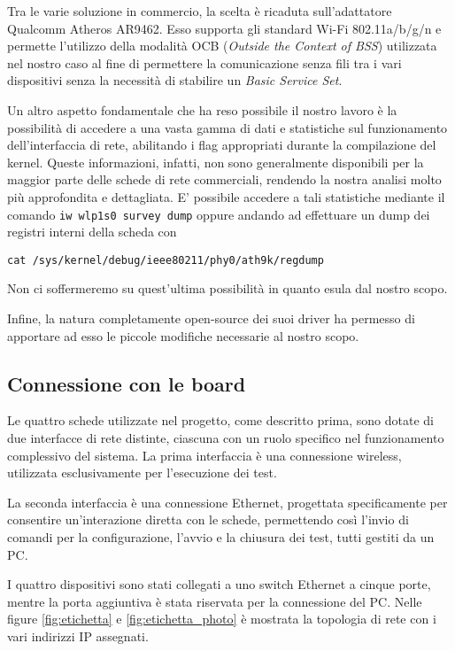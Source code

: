 Tra le varie soluzione in commercio, la scelta è ricaduta sull'adattatore Qualcomm Atheros AR9462. Esso supporta gli standard Wi-Fi 802.11a/b/g/n e permette l'utilizzo della modalità OCB (\textit{Outside the Context of BSS}) utilizzata nel nostro caso al fine di permettere la comunicazione senza fili tra i vari dispositivi senza la necessità di stabilire un \textit{Basic Service Set}.

Un altro aspetto fondamentale che ha reso possibile il nostro lavoro è la possibilità di accedere a una vasta gamma di dati e statistiche sul funzionamento dell'interfaccia di rete, abilitando i flag appropriati durante la compilazione del kernel. Queste informazioni, infatti, non sono generalmente disponibili per la maggior parte delle schede di rete commerciali, rendendo la nostra analisi molto più approfondita e dettagliata. E' possibile accedere a tali statistiche mediante il comando \verb|iw wlp1s0 survey dump| oppure andando ad effettuare un dump dei registri interni della scheda con

\begin{lstlisting}
cat /sys/kernel/debug/ieee80211/phy0/ath9k/regdump
\end{lstlisting}

\noindent Non ci soffermeremo su quest'ultima possibilità in quanto esula dal nostro scopo.

Infine, la natura completamente open-source dei suoi driver ha permesso di apportare ad esso le piccole modifiche necessarie al nostro scopo.

\subsection[Connessione con le board]{Connessione con le board}
Le quattro schede utilizzate nel progetto, come descritto prima, sono dotate di due interfacce di rete distinte, ciascuna con un ruolo specifico nel funzionamento complessivo del sistema. La prima interfaccia è una connessione wireless, utilizzata esclusivamente per l'esecuzione dei test.

La seconda interfaccia è una connessione Ethernet, progettata specificamente per consentire un'interazione diretta con le schede, permettendo così l'invio di comandi per la configurazione, l'avvio e la chiusura dei test, tutti gestiti da un PC.

I quattro dispositivi sono stati collegati a uno switch Ethernet a cinque porte, mentre la porta aggiuntiva è stata riservata per la connessione del PC. Nelle figure \ref{fig:etichetta} e \ref{fig:etichetta_photo} è mostrata la topologia di rete con i vari indirizzi IP assegnati.


